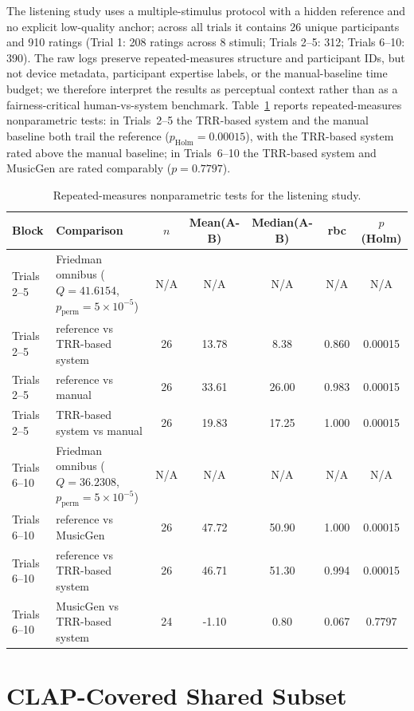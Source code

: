 \documentclass[journal,10pt]{IEEEtran}
\begin{document}
The listening study uses a multiple-stimulus protocol with a hidden reference and no explicit low-quality anchor; across all trials it contains 26 unique participants and 910 ratings (Trial 1: 208 ratings across 8 stimuli; Trials 2--5: 312; Trials 6--10: 390). The raw logs preserve repeated-measures structure and participant IDs, but not device metadata, participant expertise labels, or the manual-baseline time budget; we therefore interpret the results as perceptual context rather than as a fairness-critical human-vs-system benchmark. Table~\ref{tab:listening_tests} reports repeated-measures nonparametric tests: in Trials~2--5 the TRR-based system and the manual baseline both trail the reference ($p_{\mathrm{Holm}}=0.00015$), with the TRR-based system rated above the manual baseline; in Trials~6--10 the TRR-based system and MusicGen are rated comparably ($p=0.7797$).

\begin{table}[t]
	\centering
	\caption{Repeated-measures nonparametric tests for the listening study.}
	\label{tab:listening_tests}
	\footnotesize
	\begin{tabular}{llccccc}
		\toprule
		\textbf{Block} & \textbf{Comparison} & \textbf{$n$} & \textbf{Mean(A-B)} & \textbf{Median(A-B)} & \textbf{rbc} & \textbf{$p$ (Holm)} \\
		\midrule
		Trials 2--5 & Friedman omnibus ($Q=41.6154$, $p_{\mathrm{perm}}=5\times10^{-5}$) & N/A & N/A & N/A & N/A & N/A \\
		Trials 2--5 & reference vs TRR-based system & 26 & 13.78 & 8.38 & 0.860 & 0.00015 \\
		Trials 2--5 & reference vs manual & 26 & 33.61 & 26.00 & 0.983 & 0.00015 \\
		Trials 2--5 & TRR-based system vs manual & 26 & 19.83 & 17.25 & 1.000 & 0.00015 \\
		Trials 6--10 & Friedman omnibus ($Q=36.2308$, $p_{\mathrm{perm}}=5\times10^{-5}$) & N/A & N/A & N/A & N/A & N/A \\
		Trials 6--10 & reference vs MusicGen & 26 & 47.72 & 50.90 & 1.000 & 0.00015 \\
		Trials 6--10 & reference vs TRR-based system & 26 & 46.71 & 51.30 & 0.994 & 0.00015 \\
		Trials 6--10 & MusicGen vs TRR-based system & 24 & -1.10 & 0.80 & 0.067 & 0.7797 \\
		\bottomrule
	\end{tabular}
\end{table}

\section{CLAP-Covered Shared Subset}
\end{document}
